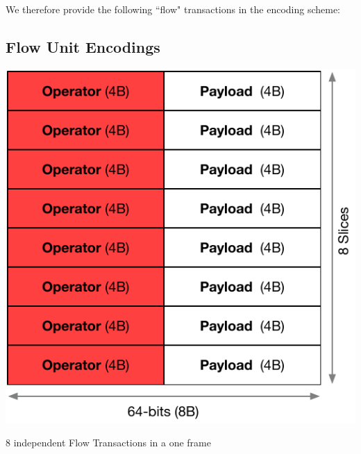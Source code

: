 \documentclass[../../../OAE-SPEC-MAIN.tex]{subfiles}
\begin{document}
We therefore provide the following ``flow" transactions in the encoding scheme:




\subsection{Flow Unit Encodings}

\begin{marginfigure}[-10mm]
  \includegraphics[width=\linewidth]{./figures/8-slices.pdf}
  \caption{8 independent Flow Transactions in a one frame}
  \vspace{8pt}
\end{marginfigure}
\end{document}
